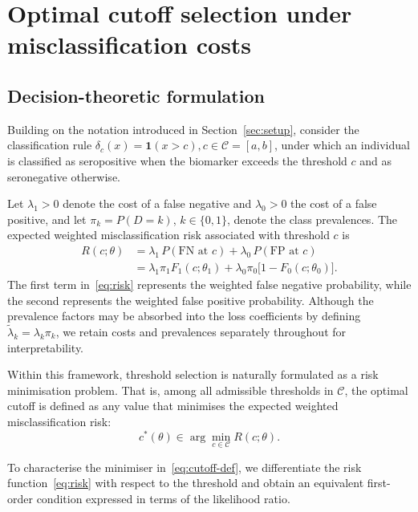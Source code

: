\documentclass[11pt,a4paper]{article}
\theoremstyle{definition}
\theoremstyle{remark}
\newcommand{\1}{\mathbf{1}}
\begin{document}

\section{Optimal cutoff selection under misclassification costs}
\label{sec:cutoff}

\subsection{Decision-theoretic formulation}

Building on the notation introduced in Section~\ref{sec:setup},
consider the classification rule $\delta_c(x)=\mathbf{1}(x>c), c\in\mathcal C=[a,b]$, under which an individual is classified as seropositive when the biomarker exceeds the threshold $c$ and as seronegative otherwise.

Let $\lambda_1>0$ denote the cost of a false negative and
$\lambda_0>0$ the cost of a false positive, and let
$\pi_k=P(D=k)$, $k\in\{0,1\}$, denote the class prevalences.
The expected weighted misclassification risk associated with
threshold $c$ is
\begin{align}
R(c;\theta)
&=
\lambda_1\,P(\text{FN at }c)
+
\lambda_0\,P(\text{FP at }c)
\nonumber\\
&=
\lambda_1\pi_1 F_1(c;\theta_1)
+
\lambda_0\pi_0\bigl[1-F_0(c;\theta_0)\bigr].
\label{eq:risk}
\end{align}
The first term in~\eqref{eq:risk} represents the weighted false
negative probability, while the second represents the weighted
false positive probability. Although the prevalence factors may
be absorbed into the loss coefficients by defining
$\tilde\lambda_k=\lambda_k\pi_k$, we retain costs and
prevalences separately throughout for interpretability.

Within this framework, threshold selection is naturally
formulated as a risk minimisation problem. That is, among all
admissible thresholds in $\mathcal C$, the optimal cutoff is
defined as any value that minimises the expected weighted
misclassification risk:
\begin{equation}
\label{eq:cutoff-def}
c^*(\theta)\in\arg\min_{c\in\mathcal C} R(c;\theta).
\end{equation}

To characterise the minimiser in~\eqref{eq:cutoff-def}, we
differentiate the risk function~\eqref{eq:risk} with respect to the threshold and obtain an equivalent first-order condition expressed in terms of the likelihood ratio.
\end{document}
